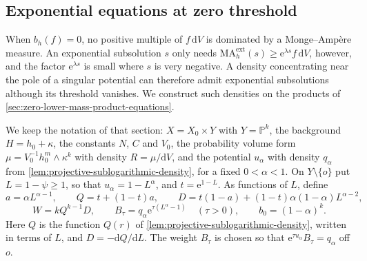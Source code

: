 

\subsection{Exponential equations at zero threshold}
\label{subsec:zero-threshold-product-exponential}

When $b_h(f)=0$, no positive multiple of $f\,\mathrm{d}V$ is dominated by a Monge--Amp\`ere measure. An exponential subsolution $s$ only needs $\mathrm{MA}^{\mathrm{ext}}_h(s)\geq\mathrm{e}^{\lambda s}f\,\mathrm{d}V$, however, and the factor $\mathrm{e}^{\lambda s}$ is small where $s$ is very negative. A density concentrating near the pole of a singular potential can therefore admit exponential subsolutions although its threshold vanishes. We construct such densities on the products of \cref{sec:zero-lower-mass-product-equations}.

We keep the notation of that section: $X=X_0\times Y$ with $Y=\mathbb P^k$, the background $H=h_0+\kappa$, the constants $N$, $C$ and $V_0$, the probability volume form $\mu=V_0^{-1}h_0^m\wedge\kappa^k$ with density $R=\mu/\mathrm{d}V$, and the potential $u_\alpha$ with density $q_\alpha$ from \cref{lem:projective-sublogarithmic-density}, for a fixed $0<\alpha<1$. On $Y\setminus\{o\}$ put $L=1-\psi\geq1$, so that $u_\alpha=1-L^\alpha$, and $t=\mathrm e^{1-L}$. As functions of $L$, define
\[
 a=\alpha L^{\alpha-1},\qquad Q=t+(1-t)a,\qquad
 D=t(1-a)+(1-t)\alpha(1-\alpha)L^{\alpha-2},
\]
\[
 W=kQ^{k-1}D,\qquad
 B_\tau=q_\alpha\mathrm e^{\tau(L^\alpha-1)}\quad(\tau>0),\qquad
 b_0=(1-\alpha)^k.
\]
Here $Q$ is the function $Q(r)$ of \cref{lem:projective-sublogarithmic-density}, written in terms of $L$, and $D=-\mathrm{d}Q/\mathrm{d}L$. The weight $B_\tau$ is chosen so that $\mathrm e^{\tau u_\alpha}B_\tau=q_\alpha$ off $o$.

